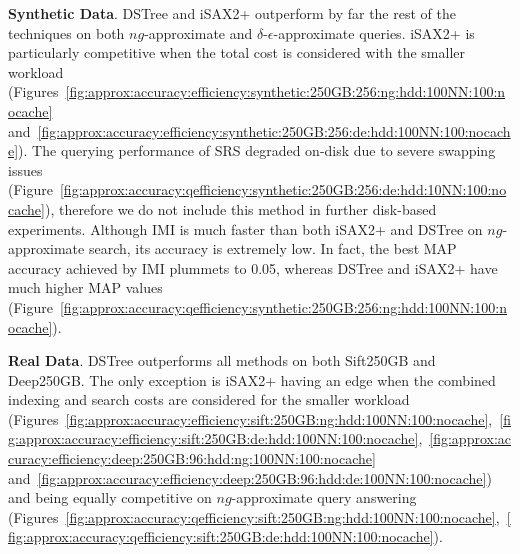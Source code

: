 {{\noindent\textbf{Synthetic Data}. DSTree and iSAX2+ outperform by far the rest of the techniques on both $ng$-approximate and $\delta$-$\epsilon$-approximate queries. iSAX2+ is particularly competitive when the total cost is considered with the smaller workload (Figures~\ref{fig:approx:accuracy:efficiency:synthetic:250GB:256:ng:hdd:100NN:100:nocache} and~\ref{fig:approx:accuracy:efficiency:synthetic:250GB:256:de:hdd:100NN:100:nocache}). The querying performance of SRS degraded on-disk due to severe swapping issues (Figure~\ref{fig:approx:accuracy:qefficiency:synthetic:250GB:256:de:hdd:10NN:100:nocache}), therefore we do not include this method in further disk-based experiments. Although IMI is much faster than both iSAX2+ and DSTree on $ng$-approximate search, its accuracy is extremely low. In fact, the best MAP accuracy achieved by IMI plummets to 0.05, whereas DSTree and iSAX2+ have much higher MAP values (Figure~\ref{fig:approx:accuracy:qefficiency:synthetic:250GB:256:ng:hdd:100NN:100:nocache}).


\noindent\textbf{Real Data}. DSTree outperforms all methods %
on both Sift250GB and Deep250GB. The only exception is iSAX2+ having an edge when the combined indexing and search costs are considered for the smaller workload (Figures~\ref{fig:approx:accuracy:efficiency:sift:250GB:ng:hdd:100NN:100:nocache},~\ref{fig:approx:accuracy:efficiency:sift:250GB:de:hdd:100NN:100:nocache},~\ref{fig:approx:accuracy:efficiency:deep:250GB:96:hdd:ng:100NN:100:nocache} and~\ref{fig:approx:accuracy:efficiency:deep:250GB:96:hdd:de:100NN:100:nocache}) and being equally competitive on $ng$-approximate query answering (Figures~\ref{fig:approx:accuracy:qefficiency:sift:250GB:ng:hdd:100NN:100:nocache},~\ref{fig:approx:accuracy:qefficiency:sift:250GB:de:hdd:100NN:100:nocache}).

}}

